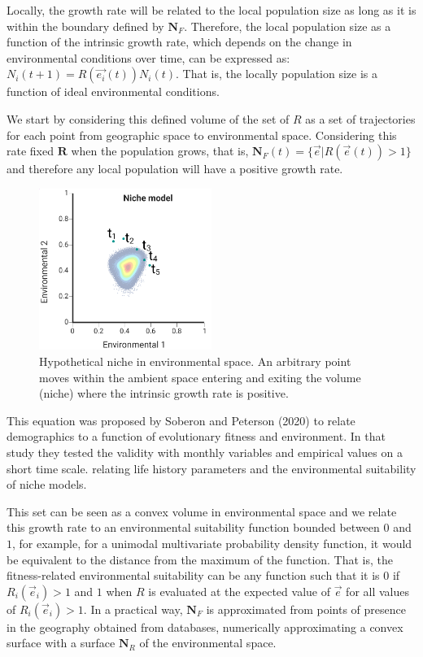 \documentclass[
]{article}
\begin{document}
Locally, the growth rate will be related to the local population size as
long as it is within the boundary defined by \(\mathbf{N}_F\).
Therefore, the local population size as a function of the intrinsic
growth rate, which depends on the change in environmental conditions
over time, can be expressed as: \(N_i(t+1) = R(\vec{e_i}(t) ) N_i(t)\).
That is, the locally population size is a function of ideal
environmental conditions.

We start by considering this defined volume of the set of \(R\) as a set
of trajectories for each point from geographic space to environmental
space. Considering this rate fixed \(\mathbf{R}\) when the population
grows, that is, \(\mathbf{N}_F(t) = \{\vec{e} | R(\vec{e}(t)) > 1 \}\)
and therefore any local population will have a positive growth rate.

\begin{figure}
\centering
\includegraphics[width=0.5\textwidth,height=\textheight]{all_figures/figure_1.png}
\caption{Hypothetical niche in environmental space. An arbitrary point
moves within the ambient space entering and exiting the volume (niche)
where the intrinsic growth rate is positive.}
\end{figure}

This equation was proposed by Soberon and Peterson (2020) to relate
demographics to a function of evolutionary fitness and environment. In
that study they tested the validity with monthly variables and empirical
values on a short time scale. relating life history parameters and the
environmental suitability of niche models.

This set can be seen as a convex volume in environmental space and we
relate this growth rate to an environmental suitability function bounded
between \(0\) and \(1\), for example, for a unimodal multivariate
probability density function, it would be equivalent to the distance
from the maximum of the function. That is, the fitness-related
environmental suitability can be any function such that it is \(0\) if
\(R_i(\vec{e}_i) > 1\) and \(1\) when \(R\) is evaluated at the expected
value of \(\vec {e}\) for all values of \(R_i(\vec{e}_i) > 1\). In a
practical way, \(\mathbf{N}_F\) is approximated from points of presence
in the geography obtained from databases, numerically approximating a
convex surface with a surface \(\mathbf{N}_R\) of the environmental
space.
\end{document}

